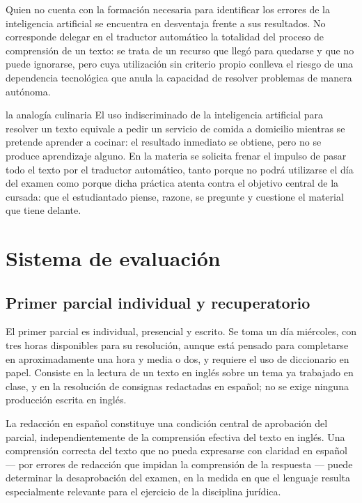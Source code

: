 \documentclass[12pt,oneside]{book}
\begin{document}
\begin{important}
Quien no cuenta con la formación necesaria para identificar los errores de la inteligencia artificial se encuentra en desventaja frente a sus resultados. No corresponde delegar en el traductor automático la totalidad del proceso de comprensión de un texto: se trata de un recurso que llegó para quedarse y que no puede ignorarse, pero cuya utilización sin criterio propio conlleva el riesgo de una dependencia tecnológica que anula la capacidad de resolver problemas de manera autónoma.
\end{important}

\begin{example}{la analogía culinaria}
El uso indiscriminado de la inteligencia artificial para resolver un texto equivale a pedir un servicio de comida a domicilio mientras se pretende aprender a cocinar: el resultado inmediato se obtiene, pero no se produce aprendizaje alguno. En la materia se solicita frenar el impulso de pasar todo el texto por el traductor automático, tanto porque no podrá utilizarse el día del examen como porque dicha práctica atenta contra el objetivo central de la cursada: que el estudiantado piense, razone, se pregunte y cuestione el material que tiene delante.
\end{example}

\chapter{Sistema de evaluación}

\section{Primer parcial individual y recuperatorio}

El primer parcial es individual, presencial y escrito. Se toma un día miércoles, con tres horas disponibles para su resolución, aunque está pensado para completarse en aproximadamente una hora y media o dos, y requiere el uso de diccionario en papel. Consiste en la lectura de un texto en inglés sobre un tema ya trabajado en clase, y en la resolución de consignas redactadas en español; no se exige ninguna producción escrita en inglés.

\begin{important}
La redacción en español constituye una condición central de aprobación del parcial, independientemente de la comprensión efectiva del texto en inglés. Una comprensión correcta del texto que no pueda expresarse con claridad en español --- por errores de redacción que impidan la comprensión de la respuesta --- puede determinar la desaprobación del examen, en la medida en que el lenguaje resulta especialmente relevante para el ejercicio de la disciplina jurídica.
\end{important}
\end{document}
